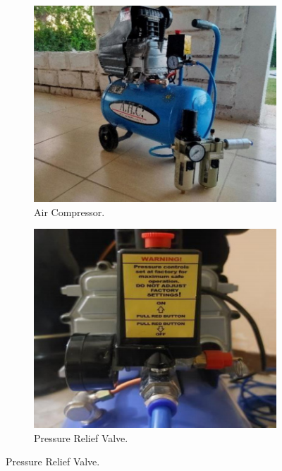 \documentclass[11pt, twocolumn]{article}
\begin{document}
\begin{itemize}[leftmargin=0pt, itemindent=10pt]
    \begin{figure}[h] 
        \centering
        \begin{subfigure}[b]{0.49\columnwidth} 
            \centering
            \includegraphics[width=\linewidth]{Images/Air Compressor.jpg}
            \caption{Air Compressor.}
            \label{fig:compressor}
        \end{subfigure}
        \hfill
        \begin{subfigure}[b]{0.49\columnwidth}
            \centering
            \includegraphics[width=\linewidth]{Images/Pressure Relief Valve.jpg}
            \caption{Pressure Relief Valve.}
            \label{fig:releif_valve}
        \end{subfigure}
    

\end{figure}
\end{itemize}
\end{document}
